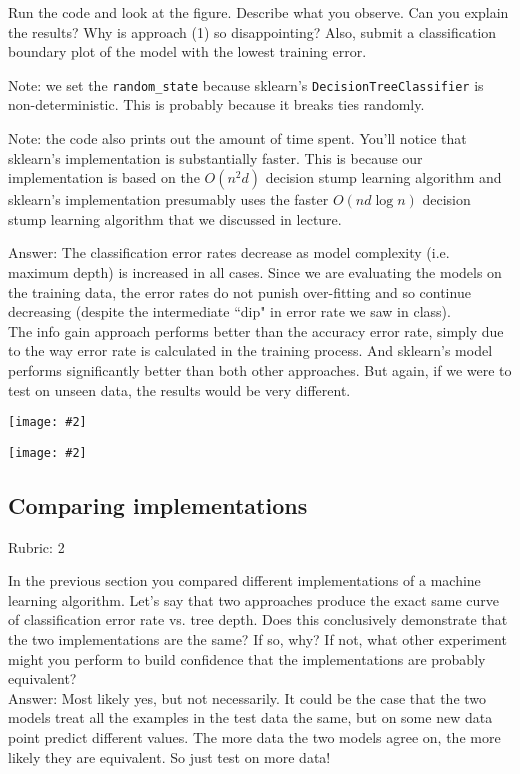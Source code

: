 \documentclass{article}
\newcommand{\ans}[1]{\green{Answer: #1}}
\newcommand{\rubric}[1]{\green{Rubric: #1}}
\newcommand{\blue}[1]{{\color{blue}#1}}
\newcommand{\green}[1]{{\color{green}#1}}
\newcommand{\centerfig}[2]{\begin{center}\texttt{[image: \#2]}\end{center}}
\begin{document}
    Run the code and look at the figure.
    \blue{Describe what you observe. Can you explain the results?} Why is approach (1) so disappointing? Also, \blue{submit a classification boundary plot of the model with the lowest training error}.

    Note: we set the \verb|random_state| because sklearn's \texttt{DecisionTreeClassifier} is non-deterministic. This is probably
    because it breaks ties randomly.

    Note: the code also prints out the amount of time spent. You'll notice that sklearn's implementation is substantially faster. This is because
    our implementation is based on the $O(n^2 d)$ decision stump learning algorithm and sklearn's implementation presumably uses the faster $O(nd\log n)$
    decision stump learning algorithm that we discussed in lecture.

    \ans{The classification error rates decrease as model complexity (i.e. maximum depth) is increased in all cases. Since we are evaluating the models on the training data, the error rates do not punish over-fitting and so continue decreasing (despite the intermediate ``dip" in error rate we saw in class). \\
    The info gain approach performs better than the accuracy error rate, simply due to the way error rate is calculated in the training process. And sklearn's model performs significantly better than both other approaches. But again, if we were to test on unseen data, the results would be very different.}

    \centerfig{0.7}{../figs/q6_5_tree_errors}
    \centerfig{0.7}{../figs/q6_5_decisionBoundary}


    \subsection{Comparing implementations}
    \rubric{2}

    In the previous section you compared different implementations of a machine learning algorithm. Let's say that two
    approaches produce the exact same curve of classification error rate vs. tree depth. Does this conclusively demonstrate
    that the two implementations are the same? If so, why? If not, what other experiment might you perform to build confidence
    that the implementations are probably equivalent?\\
    \ans{Most likely yes, but not necessarily. It could be the case that the two models treat all the examples in the test data the same, but on some new data point predict different values. The more data the two models agree on, the more likely they are equivalent. So just test on more data!}
\end{document}
